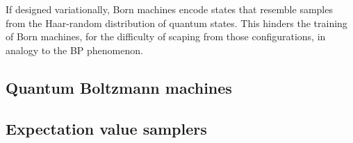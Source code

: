 \documentclass[]{report}
\begin{document}
If designed variationally, Born machines encode states that resemble samples from the Haar-random distribution of quantum states. This hinders the training of Born machines, for the difficulty of scaping from those configurations, in analogy to the BP phenomenon. 

\subsection{Quantum Boltzmann machines}

\subsection{Expectation value samplers}
\printbibliography
\end{document}
